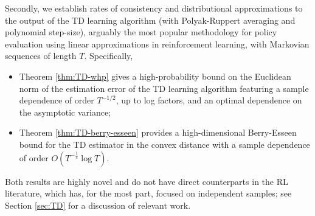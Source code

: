 Secondly, we establish rates of consistency and distributional approximations to the output of the TD learning algorithm (with Polyak-Ruppert averaging and polynomial step-size), arguably the most popular methodology for policy evaluation using linear approximations in reinforcement learning, with Markovian sequences of length $T$. Specifically, 
\begin{itemize}
\setlength{\itemsep}{0pt}
\item Theorem \ref{thm:TD-whp} gives a high-probability bound on the Euclidean norm of the estimation error of the TD learning algorithm featuring a sample dependence of order $T^{-1/2}$, up to log factors, and an optimal dependence on the asymptotic variance;
\item Theorem \ref{thm:TD-berry-esseen} provides a high-dimensional Berry-Esseen bound  for the TD estimator in the convex distance with a sample dependence of order $O(T^{-\frac{1}{4}}\log T)$. 
\end{itemize}
Both results are highly novel and do not have direct counterparts in the RL literature, which has, for the most part, focused on independent samples; see Section \ref{sec:TD} for a discussion of relevant work. 

